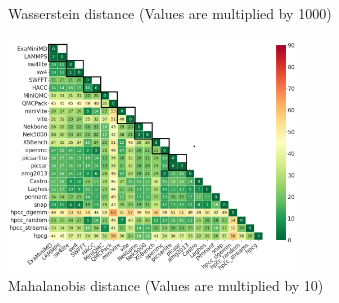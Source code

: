 \begin{figure}[htbp]
\begin{minipage}[t]{0.48\textwidth}
	\vspace*{-5mm}
	\caption{Wasserstein distance (Values are multiplied by 1000)}
	\label{figs:Wasserstein}
	\end{minipage}
\hspace{.1in}	
\begin{minipage}[t]{0.48\textwidth}
	\centering
	\includegraphics[width=3in]{figs/Mahalanobis distance_m10.png}
	\vspace*{-5mm}
	\caption{Mahalanobis distance (Values are multiplied by 10)}
	\label{figs:Mahalanobis}
	\end{minipage}
\hspace{.1in}
\end{figure}

